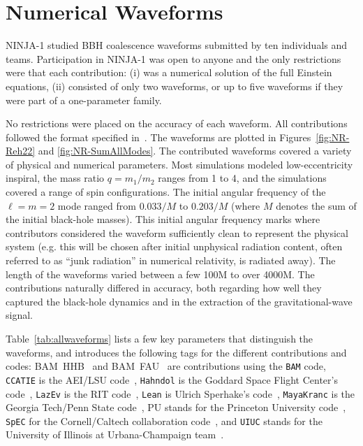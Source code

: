
\section{Numerical Waveforms}
\label{sec:ninja1_nrwaveforms}

NINJA-1 studied BBH coalescence waveforms submitted by ten individuals
and teams.  Participation in NINJA-1 was open to anyone and the only
restrictions were that each contribution: (i) was a numerical solution
of the full Einstein equations, (ii) consisted of only two waveforms,
or up to five waveforms if they were part of a one-parameter family.

No restrictions were placed on the accuracy of each waveform. All
contributions followed the format specified in~\cite{Brown:2007jx}.
The waveforms are plotted in Figures~\ref{fig:NR-Reh22} and
\ref{fig:NR-SumAllModes}.
%
The contributed waveforms covered a variety of physical and numerical
parameters. Most simulations modeled low-eccentricity inspiral, the mass
ratio $q = m_1/m_2$ ranges from 1 to 4, and the simulations covered a
range of spin configurations.  The initial angular frequency of the
$\ell=m=2$ mode ranged from $0.033/M$ to $0.203/M$ (where $M$ denotes
the sum of the initial black-hole masses). This initial angular
frequency marks where contributors considered the waveform sufficiently
clean to represent the physical system (e.g. this will be chosen after
initial unphysical radiation content, often referred to as ``junk
radiation'' in numerical relativity, is radiated away).   The length
of the waveforms varied between a few 100M to over 4000M.  The
contributions naturally differed in accuracy, both regarding how well
they captured the black-hole dynamics and in the extraction of the
gravitational-wave signal. 

Table~\ref{tab:allwaveforms} lists a few key parameters that
distinguish the waveforms, and introduces the following tags for the
different contributions and codes:
%
%
BAM~HHB~\cite{Brugmann:2008zz,Husa:2007hp,Hannam:2007ik,Hannam:2007wf,Bruegmann:2003aw} 
and BAM~FAU~\cite{Brugmann:2008zz,Husa:2007hp,Tichy:2008du,Bruegmann:2003aw}
are contributions using the {\tt BAM} code,
{\tt CCATIE} is the AEI/LSU code~\cite{Alcubierre:2000xu,Alcubierre:2002kk,Koppitz:2007ev,Pollney:2007ss,Rezzolla:2007xa},
{\tt Hahndol} is the Goddard Space Flight Center's code~\cite{Imbiriba:2004tp,vanMeter:2006vi}, 
{\tt LazEv} is the RIT code~\cite{Zlochower:2005bj,Campanelli:2005dd,Dain:2008ck}, 
{\tt Lean} is Ulrich Sperhake's code~\cite{Sperhake:2006cy,Sperhake:2007gu,Sperhake:2008ga}, 
{\tt MayaKranc} is the Georgia Tech/Penn State code~\cite{Vaishnav:2007nm,Hinder:2007qu}, 
PU stands for the Princeton University code~\cite{Pretorius:2004jg,Pretorius:2005gq,Buonanno:2006ui,Pretorius:2007jn},
{\tt SpEC} for the Cornell/Caltech collaboration 
code~\cite{Scheel:2006gg,Pfeiffer:2007yz,Boyle:2007ft,Scheel:2008rj},
and
{\tt UIUC} stands for the University of Illinois at
Urbana-Champaign team~\cite{Etienne:2007hr}.

